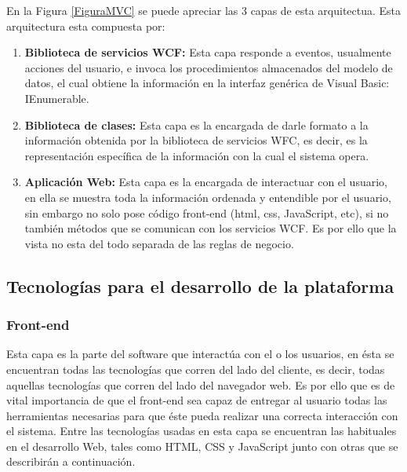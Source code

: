 En la Figura \ref{FiguraMVC} se puede apreciar las 3 capas de esta arquitectua. Esta arquitectura esta compuesta por:
\begin{enumerate}
	\item \textbf{Biblioteca de servicios WCF:} Esta capa responde a eventos, usualmente acciones del usuario, e invoca los procedimientos almacenados del modelo de datos, el cual obtiene la información en la interfaz genérica de Visual Basic: IEnumerable.
	
	\item \textbf{Biblioteca de clases:} Esta capa es la encargada de darle formato a la información obtenida por la biblioteca de servicios WFC, es decir, es la representación específica de la información con la cual el sistema opera.
	
	\item \textbf{Aplicación Web:} Esta capa es la encargada de interactuar con el usuario, en ella se muestra toda la información ordenada y entendible por el usuario, sin embargo no solo pose código front-end (html, css, JavaScript, etc), si no también métodos que se comunican con los servicios WCF. Es por ello que la vista  no esta del todo separada de las reglas de negocio.
\end{enumerate}



	


\subsection{Tecnologías para el desarrollo de la plataforma}

\subsubsection{Front-end}

Esta capa es la parte del software que interactúa con el o los usuarios, en ésta  se encuentran todas las tecnologías que corren del lado del cliente, es decir, todas aquellas tecnologías que corren del lado del navegador web. Es por ello que es de vital importancia de que el front-end sea capaz de entregar  al usuario todas las herramientas necesarias para que éste pueda realizar una correcta interacción con el sistema. Entre las tecnologías usadas en esta capa se encuentran las habituales en el desarrollo Web, tales como HTML, CSS y JavaScript junto con otras que se describirán a continuación.


